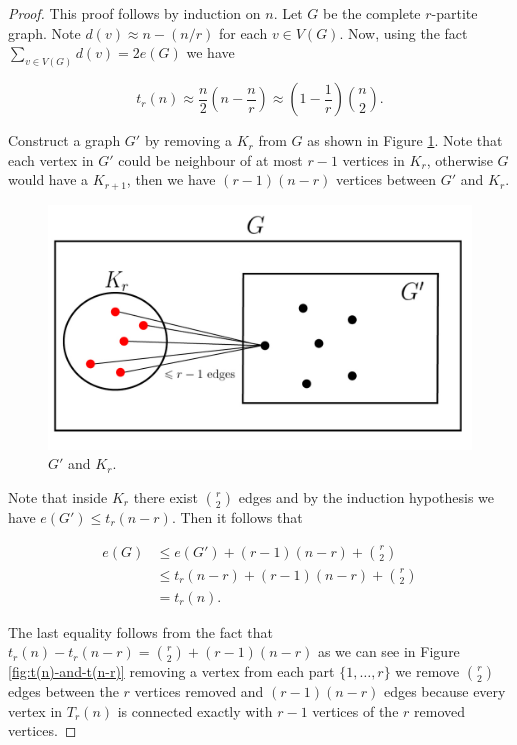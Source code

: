 \documentclass[12pt,twoside,a4paper,bibliography=totocnumbered]{book}
\numberwithin{equation}{section}
\theoremstyle{remark}
\begin{document}
\begin{proof}
This proof follows by induction on $n$. Let $G$ be the complete $r$-partite graph. Note $d(v) \approx n-(n/r)$ for each $v \in V(G)$. Now, using the fact $\sum_{v\in V(G)} d(v) = 2 e(G)$ we have

$$ t_r(n) \approx \frac{n}{2}\left(n-\frac{n}{r}\right) \approx \left(1-\frac{1}{r}\right) \binom{n}{2}.$$

Construct a graph $G'$ by removing a $K_r$ from $G$ as shown in Figure \ref{fig:G'andKr}. Note that each vertex in $G'$ could be neighbour of at most $r-1$ vertices in $K_r$, otherwise $G$ would have a $K_{r+1}$, then we have $(r-1)(n-r)$ vertices between $G'$ and $K_r$.
 
 \begin{figure}[H]
     \centering
     \includegraphics[scale=1]{Figuras/Kr+1-livre-prova-turan.jpg}
     \caption{$G'$ and $K_r$.}
     \label{fig:G'andKr}
\end{figure}

Note that inside $K_r$ there exist $\binom{r}{2}$ edges and by the induction hypothesis we have $e(G') \leq t_r(n-r)$. Then it follows that

\begin{align*}
e(G) &\leq e(G') + (r-1)(n-r) + \binom{r}{2}\\
&\leq t_r(n-r) +(r-1)(n-r) + \binom{r}{2}\\
&= t_r(n).
\end{align*}

The last equality follows from the fact that $t_r(n) - t_r(n-r) = \binom{r}{2} + (r-1)(n-r)$ as we can see in Figure \ref{fig:t(n)-and-t(n-r)} removing a vertex from each part $\{1,\ldots,r\}$ we remove $\binom{r}{2}$ edges between the $r$ vertices removed and $(r-1)(n-r)$ edges  because every vertex in $T_r(n)$ is connected exactly with $r-1$ vertices of the $r$ removed vertices.   


\end{proof}
\end{document}
